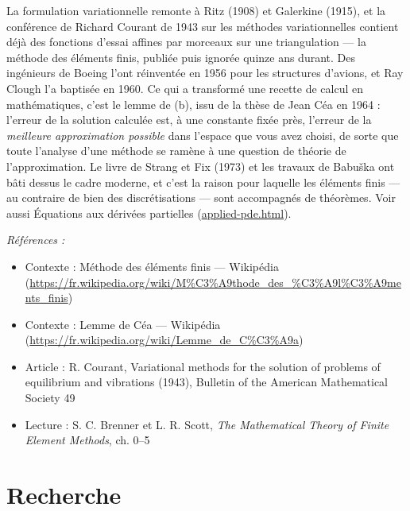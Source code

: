 \documentclass[11pt]{article}
\newenvironment{refs}{\par\small\noindent\emph{Références :}\begin{itemize}\setlength\itemsep{0pt}}{\end{itemize}\normalsize}
\begin{document}
\noindent La formulation variationnelle remonte à Ritz (1908) et Galerkine (1915), et la conférence de Richard Courant de 1943 sur les méthodes variationnelles contient déjà des fonctions d'essai affines par morceaux sur une triangulation --- la méthode des éléments finis, publiée puis ignorée quinze ans durant. Des ingénieurs de Boeing l'ont réinventée en 1956 pour les structures d'avions, et Ray Clough l'a baptisée en 1960. Ce qui a transformé une recette de calcul en mathématiques, c'est le lemme de (b), issu de la thèse de Jean Céa en 1964 : l'erreur de la solution calculée est, à une constante fixée près, l'erreur de la \textit{meilleure approximation possible} dans l'espace que vous avez choisi, de sorte que toute l'analyse d'une méthode se ramène à une question de théorie de l'approximation. Le livre de Strang et Fix (1973) et les travaux de Babu\v{s}ka ont bâti dessus le cadre moderne, et c'est la raison pour laquelle les éléments finis --- au contraire de bien des discrétisations --- sont accompagnés de théorèmes. Voir aussi Équations aux dérivées partielles (\url{applied-pde.html}).

\begin{refs}
\item Contexte : Méthode des éléments finis --- Wikipédia (\url{https://fr.wikipedia.org/wiki/M%C3%A9thode_des_%C3%A9l%C3%A9ments_finis})
\item Contexte : Lemme de Céa --- Wikipédia (\url{https://fr.wikipedia.org/wiki/Lemme_de_C%C3%A9a})
\item Article : R. Courant, \og{} Variational methods for the solution of problems of equilibrium and vibrations \fg{} (1943), Bulletin of the American Mathematical Society 49
\item Lecture : S. C. Brenner et L. R. Scott, \textit{The Mathematical Theory of Finite Element Methods}, ch. 0--5
\end{refs}

\bigskip


\section*{Recherche}
\end{document}
